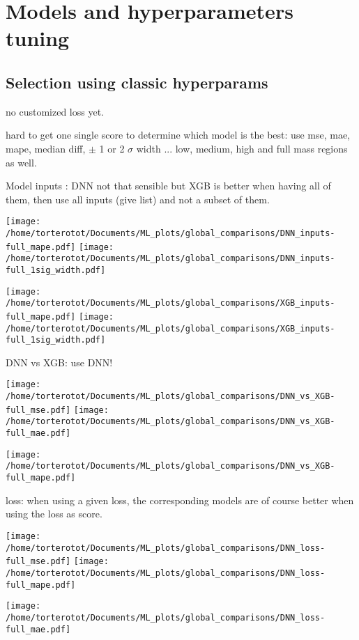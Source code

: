 \section{Models and hyperparameters tuning}\label{chapter-ML-section-hyperparameters}

\subsection{Selection using classic hyperparams}
no customized loss yet.

hard to get one single score to determine which model is the best: use mse, mae, mape, median diff, $\pm$ 1 or 2 $\sigma$ width ... low, medium, high and full mass regions as well.

Model inputs : DNN not that sensible but XGB is better when having all of them, then use all inputs (give list) and not a subset of them.


\texttt{[image: /home/torterotot/Documents/ML\_plots/global\_comparisons/DNN\_inputs-full\_mape.pdf]}
\texttt{[image: /home/torterotot/Documents/ML\_plots/global\_comparisons/DNN\_inputs-full\_1sig\_width.pdf]}

\texttt{[image: /home/torterotot/Documents/ML\_plots/global\_comparisons/XGB\_inputs-full\_mape.pdf]}
\texttt{[image: /home/torterotot/Documents/ML\_plots/global\_comparisons/XGB\_inputs-full\_1sig\_width.pdf]}

DNN vs XGB: use DNN!


\texttt{[image: /home/torterotot/Documents/ML\_plots/global\_comparisons/DNN\_vs\_XGB-full\_mse.pdf]}
\texttt{[image: /home/torterotot/Documents/ML\_plots/global\_comparisons/DNN\_vs\_XGB-full\_mae.pdf]}

\texttt{[image: /home/torterotot/Documents/ML\_plots/global\_comparisons/DNN\_vs\_XGB-full\_mape.pdf]}

loss: when using a given loss, the corresponding models are of course better when using the loss as score.

\texttt{[image: /home/torterotot/Documents/ML\_plots/global\_comparisons/DNN\_loss-full\_mse.pdf]}
\texttt{[image: /home/torterotot/Documents/ML\_plots/global\_comparisons/DNN\_loss-full\_mape.pdf]}



\texttt{[image: /home/torterotot/Documents/ML\_plots/global\_comparisons/DNN\_loss-full\_mae.pdf]}


